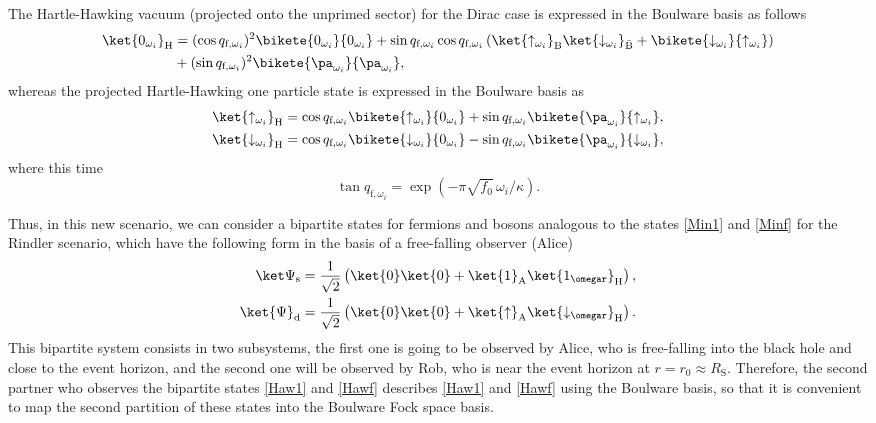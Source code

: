 The Hartle-Hawking  vacuum (projected onto the unprimed sector) for the Dirac case is expressed in the
Boulware basis as follows
\begin{align}\label{vacuumf}
 \ket{0_{\omega_i}}_{\text{H}} &= (\cos q_{\text{f},\omega_i})^2
 \bikete{0_{\omega_i}}{0_{\omega_i}}
 +\sin q_{\text{f},\omega_i}\cos q_{\text{f},\omega_i}
 \left(\ket{\uparrow_{\omega_i}}_{{\text{B}}}
  \ket{\downarrow_{\omega_i}}_{\bar{\text{B}}}+
 \bikete{\downarrow_{\omega_i}}{\uparrow_{\omega_i}}\right)
 \nonumber\\
 &+(\sin q_{\text{f},\omega_i})^2\bikete{\pa_{\omega_i}}{\pa_{\omega_i}},
\end{align}
whereas the projected Hartle-Hawking one particle state 
is expressed in the Boulware basis as
\begin{align}\label{onepartf}
 \ket{\uparrow_{\omega_i}}_\text{H}&= \cos q_{\text{f},\omega_i}
 \bikete{\uparrow_{\omega_i}}{0_{\omega_i}}+
 \sin q_{\text{f},\omega_i}\bikete{\pa_{\omega_i}}{\uparrow_{\omega_i}},\nonumber\\
\ket{\downarrow_{\omega_i}}_\text{H}&=
\cos q_{\text{f},\omega_i} \bikete{\downarrow_{\omega_i}}{0_{\omega_i}}-
\sin q_{\text{f},\omega_i}\bikete{\pa_{\omega_i}}{\downarrow_{\omega_i}},
\end{align}
where this time
\begin{equation}\label{defr4}
\tan q_{\text{f},\omega_i}=\exp\left(-\pi \sqrt{f_0}\,\omega_i /{\kappa}\right)
.
\end{equation}

Thus, in this new scenario, we can consider a bipartite states for fermions and bosons analogous to
the states \eqref{Min1} and \eqref{Minf} for the Rindler scenario, which have the following form in the basis of a free-falling observer (Alice)
\begin{align}\label{Haw1}
\ket\Psi_\text{s}&=\frac{1}{\sqrt{2}}
\left(\ket{0}\ket{0}+
\ket{1}_\text{A}\ket{1_{\omegar}}_\text{H}\right),\\*
\label{Hawf}
\ket{\Psi}_\text{d}&=\frac{1}{\sqrt2}\left(\ket{0}
\ket{0}+\ket{\uparrow}_\text{A}
\ket{\downarrow_{\omegar}}_\text{H}\right).
\end{align}
This bipartite system consists in two subsystems, the first one is going to
be observed by Alice, who is free-falling into the black hole and close to
the event horizon, and the second one will be observed by Rob, who is near
the event horizon at $r=r_0\approx R_\text{S}$. Therefore, the second
partner who observes the bipartite states
\eqref{Haw1} and \eqref{Hawf}  describes \eqref{Haw1} and  \eqref{Hawf} using the Boulware
basis, so that it is convenient to map the second partition of these states
into the Boulware Fock space basis.

